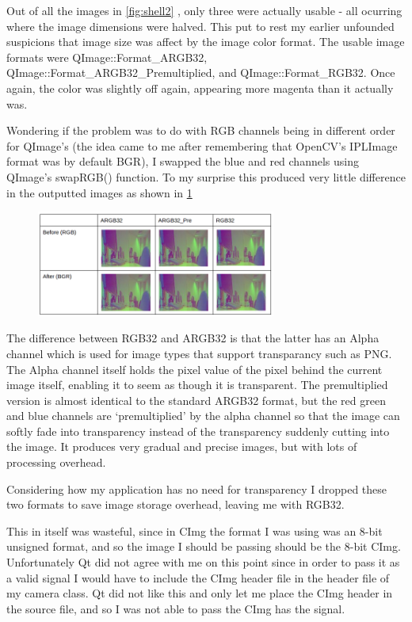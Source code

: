 \documentclass[11pt]{article} %
\begin{document}
Out of all the images in \cref{fig:shell2} , only three were actually usable - all ocurring where the image dimensions were halved. This put to rest my earlier unfounded suspicions that image size was affect by the image color format. The usable image formats were QImage::Format\_ARGB32, QImage::Format\_ARGB32\_Premultiplied, and QImage::Format\_RGB32.  Once again, the color was slightly off again, appearing more magenta than it actually was.

Wondering if the problem was to do with RGB channels being in different order for QImage’s (the idea came to me after remembering that OpenCV’s IPLImage format was by default BGR), I swapped the blue and red channels using QImage’s swapRGB() function. To my surprise this produced very little difference in the outputted images as shown in \cref{fig:swaprgb}
\begin{figure}
	\begin{center}
		\includegraphics[width=0.7\textwidth]{../images/qpix/swaprgb}
	\end{center}
	\vspace{-20pt}
	\caption{}
	\label{fig:swaprgb}
\end{figure}

 The difference between RGB32 and ARGB32 is that the latter has an Alpha channel which is used for image types that support transparancy such as PNG. The Alpha channel itself holds the pixel value of the pixel behind the current image itself, enabling it to seem as though it is transparent.  The premultiplied version is almost identical to the standard ARGB32 format, but the red green and blue channels are ‘premultiplied’ by the alpha channel so that the image can softly fade into transparency instead of the transparency suddenly cutting into the image. It produces very gradual and precise images, but with lots of processing overhead.

Considering how my application has no need for transparency I dropped these two formats to save image storage overhead, leaving me with RGB32. 

This in itself was wasteful, since in CImg the format I was using was an 8-bit unsigned format, and so the image I should be passing should be the 8-bit CImg. Unfortunately Qt did not agree with me on this point since in order to pass it as a valid signal I would have to include the CImg header file in the header file of my camera class. Qt did not like this and only let me place the CImg header in the source file, and so I was not able to pass the CImg has the signal.
\end{document}
